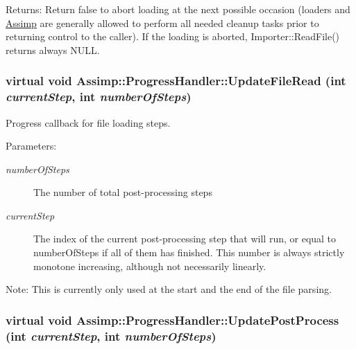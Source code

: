 \begin{Desc}
\item[Returns:]Return false to abort loading at the next possible occasion (loaders and \hyperlink{namespace_assimp}{Assimp} are generally allowed to perform all needed cleanup tasks prior to returning control to the caller). If the loading is aborted, Importer::ReadFile() returns always NULL. \end{Desc}
\hypertarget{class_assimp_1_1_progress_handler_0c867692ee9d1e25dec1e2f08fb5e20d}{
\subsubsection[UpdateFileRead]{\setlength{\rightskip}{0pt plus 5cm}virtual void Assimp::ProgressHandler::UpdateFileRead (int {\em currentStep}, \/  int {\em numberOfSteps})}}
\label{class_assimp_1_1_progress_handler_0c867692ee9d1e25dec1e2f08fb5e20d}


Progress callback for file loading steps. 

\begin{Desc}
\item[Parameters:]
\begin{description}
\item[{\em numberOfSteps}]The number of total post-processing steps \item[{\em currentStep}]The index of the current post-processing step that will run, or equal to numberOfSteps if all of them has finished. This number is always strictly monotone increasing, although not necessarily linearly.\end{description}
\end{Desc}
\begin{Desc}
\item[Note:]This is currently only used at the start and the end of the file parsing. \end{Desc}
\hypertarget{class_assimp_1_1_progress_handler_57b30d2a9b2ae1f932918f18c30196ed}{
\subsubsection[UpdatePostProcess]{\setlength{\rightskip}{0pt plus 5cm}virtual void Assimp::ProgressHandler::UpdatePostProcess (int {\em currentStep}, \/  int {\em numberOfSteps})}}
\label{class_assimp_1_1_progress_handler_57b30d2a9b2ae1f932918f18c30196ed}


